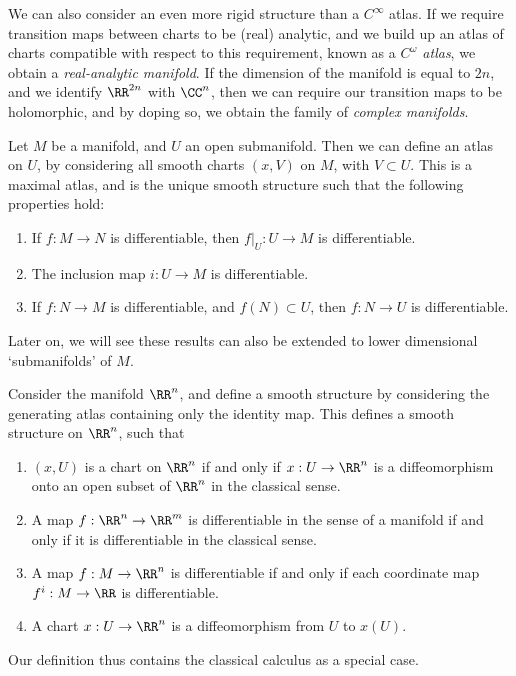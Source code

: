 We can also consider an even more rigid structure than a $C^\infty$ atlas. If we require transition maps between charts to be (real) analytic, and we build up an atlas of charts compatible with respect to this requirement, known as a \emph{$C^\omega$ atlas}, we obtain a \emph{real-analytic manifold}. If the dimension of the manifold is equal to $2n$, and we identify $\RR^{2n}$ with $\CC^n$, then we can require our transition maps to be holomorphic, and by doping so, we obtain the family of \emph{complex manifolds}.

\begin{example}
    Let $M$ be a manifold, and $U$ an open submanifold. Then we can define an atlas on $U$, by considering all smooth charts $(x,V)$ on $M$, with $V \subset U$. This is a maximal atlas, and is the unique smooth structure such that the following properties hold:
    \begin{enumerate}
        \item If $f: M \to N$ is differentiable, then $f|_U: U \to M$ is differentiable.
        \item The inclusion map $i:U \to M$ is differentiable.
        \item If $f: N \to M$ is differentiable, and $f(N) \subset U$, then $f: N \to U$ is differentiable.
    \end{enumerate}
    Later on, we will see these results can also be extended to lower dimensional `submanifolds' of $M$.
\end{example}

\begin{example}
    Consider the manifold $\RR^n$, and define a smooth structure by considering the generating atlas containing only the identity map. This defines a smooth structure on $\RR^n$, such that
    \begin{enumerate}
        \item $(x,U)$ is a chart on $\RR^n$ if and only if $x: U \to \RR^n$ is a diffeomorphism onto an open subset of $\RR^n$ in the classical sense.
        \item A map $f:\RR^n \to \RR^m$ is differentiable in the sense of a manifold if and only if it is differentiable in the classical sense.
        \item A map $f:M \to \RR^n$ is differentiable if and only if each coordinate map $f^i:M \to \RR$ is differentiable.
        \item A chart $x:U \to \RR^n$ is a diffeomorphism from $U$ to $x(U)$.
    \end{enumerate}
    Our definition thus contains the classical calculus as a special case.
\end{example}

